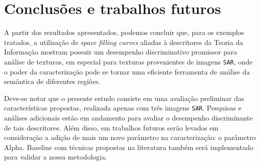 \documentclass[remotesensing,article,submit,moreauthors,pdftex,10pt,a4paper]{Definitions/mdpi}
\begin{document}
	\section{Conclusões e trabalhos futuros}\label{conclusao}
	
	A partir dos resultados apresentados, podemos concluir que, para os exemplos tratados, a utilização de \textit{space filling curves} aliadas à descritores da Teoria da Informação mostram possuir um desempenho discriminativo promissor para análise de texturas, em especial para texturas provenientes de imagens \texttt{SAR}, onde o poder da caracterização pode se tornar uma eficiente ferramenta de análise da semântica de diferentes regiões.
	
	Deve-se notar que o presente estudo consiste em uma avaliação preliminar das características propostas, realizada apenas com três imagens \texttt{SAR}. Pesquisas e análises adicionais estão em andamento para avaliar o desempenho discriminante de tais descritores. Além disso, em trabalhos futuros serão levados em consideração a adição de mais um novo parâmetro na caracterização: o parâmetro Alpha. Baseline com técnicas propostas na literatura também será implementado para validar a nossa metodologia.
	
	
	\vspace{6pt} 
	
	
	
	
\end{document}
